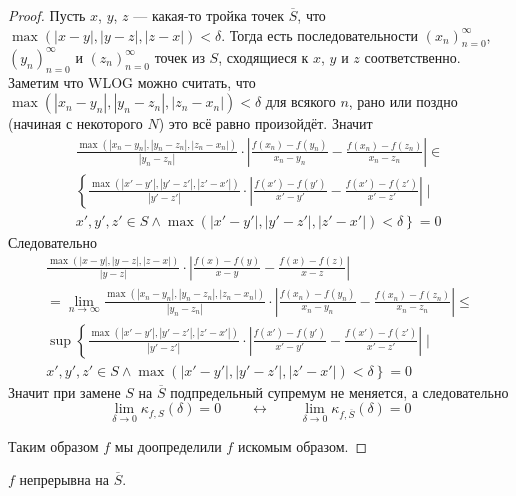 \documentclass[12pt,a4paper]{article}
\begin{document}
\begin{enumproblem}
\begin{proof}
            Пусть $x$, $y$, $z$ --- какая-то тройка точек $\overline{S}$, что $\max(|x-y|, |y-z|, |z-x|) < \delta$. Тогда есть последовательности $(x_n)_{n=0}^\infty$, $(y_n)_{n=0}^\infty$ и $(z_n)_{n=0}^\infty$ точек из $S$, сходящиеся к $x$, $y$ и $z$ соответственно. Заметим что WLOG можно считать, что $\max(|x_n-y_n|, |y_n-z_n|, |z_n-x_n|) < \delta$ для всякого $n$, рано или поздно (начиная с некоторого $N$) это всё равно произойдёт. Значит
            \begin{multline*}
                \frac{\max(|x_n-y_n|, |y_n-z_n|, |z_n-x_n|)}{|y_n-z_n|} \cdot \left|\frac{f(x_n)-f(y_n)}{x_n-y_n} - \frac{f(x_n)-f(z_n)}{x_n-z_n}\right| \in\\
                \left\{\frac{\max(|x'-y'|, |y'-z'|, |z'-x'|)}{|y'-z'|} \cdot \left|\frac{f(x')-f(y')}{x'-y'} - \frac{f(x')-f(z')}{x'-z'}\right| \mid\right.\\
                \left. x', y', z' \in S \wedge \max(|x'-y'|, |y'-z'|, |z'-x'|) < \delta\right\} = 0
            \end{multline*}
            Следовательно
            \begin{multline*}
                \frac{\max(|x-y|, |y-z|, |z-x|)}{|y-z|} \cdot \left|\frac{f(x)-f(y)}{x-y} - \frac{f(x)-f(z)}{x-z}\right|\\
                = \lim_{n \to \infty} \frac{\max(|x_n-y_n|, |y_n-z_n|, |z_n-x_n|)}{|y_n-z_n|} \cdot \left|\frac{f(x_n)-f(y_n)}{x_n-y_n} - \frac{f(x_n)-f(z_n)}{x_n-z_n}\right| \leqslant\\
                \sup \left\{\frac{\max(|x'-y'|, |y'-z'|, |z'-x'|)}{|y'-z'|} \cdot \left|\frac{f(x')-f(y')}{x'-y'} - \frac{f(x')-f(z')}{x'-z'}\right| \mid\right.\\
                \left. x', y', z' \in S \wedge \max(|x'-y'|, |y'-z'|, |z'-x'|) < \delta\right\} = 0
            \end{multline*}
            Значит при замене $S$ на $\overline{S}$ подпредельный супремум не меняется, а следовательно
            \[
                \lim_{\delta \to 0} \kappa_{f, S}(\delta) = 0
                \qquad \longleftrightarrow\qquad
                \lim_{\delta \to 0} \kappa_{f, \overline{S}}(\delta) = 0
            \]

            Таким образом $f$ мы доопределили $f$ искомым образом.
        \end{proof}

        \begin{lemma}
            $f$ непрерывна на $\overline{S}$.
        \end{lemma}


\end{enumproblem}
\end{document}
